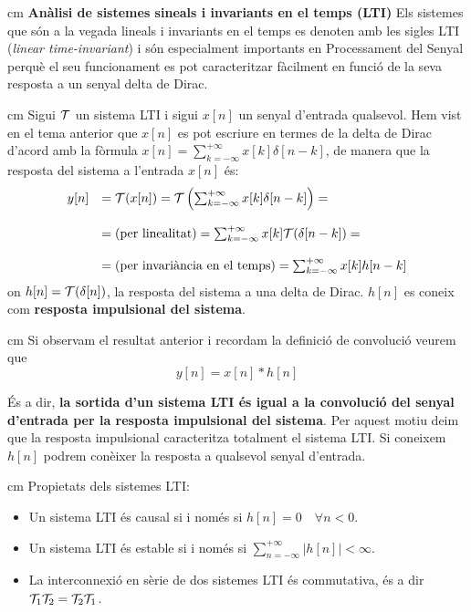 \documentclass{article}
\begin{document}
 cm
\noindent
\textbf{An\`alisi de sistemes sineals i invariants en el temps (LTI)}
Els sistemes que s\'on a la vegada lineals i invariants en el temps es
denoten amb les sigles LTI (\textit{linear time-invariant}) i s\'on
especialment importants en Processament del Senyal perqu\`e
el seu funcionament es pot caracteritzar f\`acilment en funci\'o de la seva 
resposta a un senyal delta de Dirac.

 cm
\noindent
Sigui ${\cal T}$ un sistema LTI i sigui $x[n]$ un senyal d'entrada qualsevol.
Hem vist en el tema anterior que $x[n]$ es pot escriure en termes de la delta
de Dirac d'acord amb la f\`ormula $x[n]=\sum_{k=-\infty}^{+\infty} x[k] \delta[n-k]$,
de manera que la resposta del sistema a l'entrada $x[n]$ \'es:
\[
\begin{array}{ll}
y[n]& ={\cal T}(x[n])={\cal T} \left( \sum_{k=-\infty}^{+\infty} x[k] \delta[n-k] \right) = \\ \\
&= \text{(per linealitat)} = \sum_{k=-\infty}^{+\infty} x[k] {\cal T}(\delta[n-k]) = \\ \\
&= \text{(per invari\`ancia en el temps)}= \sum_{k=-\infty}^{+\infty} x[k] h[n-k]
\end{array}
\]
\noindent
on $h[n]={\cal T}(\delta[n])$, la resposta del sistema a una delta de Dirac.
$h[n]$ es coneix com \textbf{resposta impulsional del sistema}.

 cm
\noindent
Si observam el resultat anterior i recordam la definici\'o de convoluci\'o veurem que
\[
y[n]=x[n] * h[n]
\]

\noindent
\'Es a dir, \textbf{la sortida d'un sistema LTI \'es igual a la convoluci\'o
del senyal d'entrada per la resposta impulsional del sistema}. Per aquest motiu deim
que la resposta impulsional caracteritza totalment el sistema LTI. Si coneixem $h[n]$
podrem con\`eixer la resposta a qualsevol senyal d'entrada.

 cm
\noindent
Propietats dels sistemes LTI:
\begin{itemize}
\item Un sistema LTI \'es causal si i nom\'es si $h[n]=0 \quad \forall n < 0$.
\item Un sistema LTI \'es estable si  i nom\'es si $\sum_{n=-\infty}^{+\infty} |h[n]| < \infty$. 
\item La interconnexi\'o en s\`erie de dos sistemes LTI \'es commutativa, \'es a dir ${\cal T}_1 {\cal T}_2 = {\cal T}_2 {\cal T}_1$.
\end{itemize}
\end{document}
